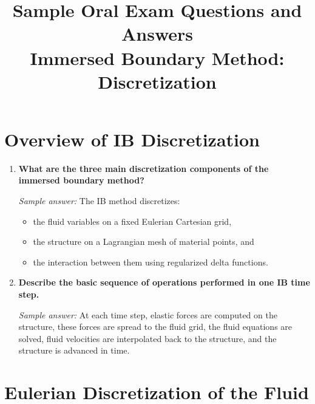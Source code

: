 \documentclass[11pt]{article}
\title{Sample Oral Exam Questions and Answers\\
Immersed Boundary Method: Discretization}
\author{}
\date{}
\begin{document}
\maketitle

\section*{Overview of IB Discretization}

\begin{enumerate}[label=\arabic*.]

\item \textbf{What are the three main discretization components of the immersed boundary method?}

\textit{Sample answer:}  
The IB method discretizes:
\begin{itemize}
\item the fluid variables on a fixed Eulerian Cartesian grid,
\item the structure on a Lagrangian mesh of material points, and
\item the interaction between them using regularized delta functions.
\end{itemize}

\item \textbf{Describe the basic sequence of operations performed in one IB time step.}

\textit{Sample answer:}  
At each time step, elastic forces are computed on the structure, these forces are spread to the fluid grid, the fluid equations are solved, fluid velocities are interpolated back to the structure, and the structure is advanced in time.

\end{enumerate}

\section*{Eulerian Discretization of the Fluid}
\end{document}
